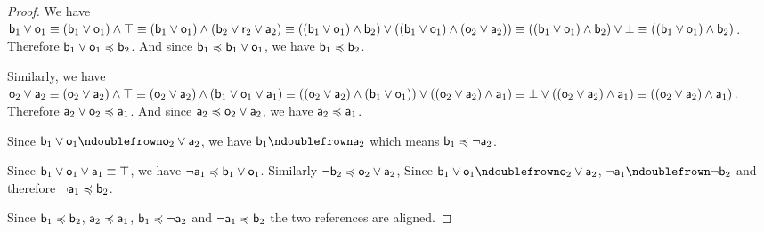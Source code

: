 \documentclass[11pt,letterpaper,fleqn]{memoir} %
\begin{document}
\begin{mathSection}
\begin{prop}
\end{prop}
\begin{proof}
	We have $\stmt[b]_1 \OR \stmt[o]_1 \equiv (\stmt[b]_1 \OR \stmt[o]_1) \AND \tautology \equiv (\stmt[b]_1 \OR \stmt[o]_1) \AND (\stmt[b]_2 \OR \stmt[r]_2 \OR \stmt[a]_2) \equiv ((\stmt[b]_1 \OR \stmt[o]_1) \AND \stmt[b]_2) \OR ((\stmt[b]_1 \OR \stmt[o]_1) \AND (\stmt[o]_2 \OR \stmt[a]_2)) \equiv ((\stmt[b]_1 \OR \stmt[o]_1) \AND \stmt[b]_2) \OR \contradiction \equiv ((\stmt[b]_1 \OR \stmt[o]_1) \AND \stmt[b]_2)$. Therefore $\stmt[b]_1 \OR \stmt[o]_1 \narrower \stmt[b]_2$. And since $\stmt[b]_1 \narrower \stmt[b]_1 \OR \stmt[o]_1$, we have $\stmt[b]_1 \narrower \stmt[b]_2$.
	
	Similarly, we have $\stmt[o]_2 \OR \stmt[a]_2 \equiv (\stmt[o]_2 \OR \stmt[a]_2) \AND \tautology \equiv (\stmt[o]_2 \OR \stmt[a]_2) \AND (\stmt[b]_1 \OR \stmt[o]_1 \OR \stmt[a]_1) \equiv ((\stmt[o]_2 \OR \stmt[a]_2) \AND (\stmt[b]_1 \OR \stmt[o]_1)) \OR ((\stmt[o]_2 \OR \stmt[a]_2) \AND \stmt[a]_1) \equiv \contradiction \OR ((\stmt[o]_2 \OR \stmt[a]_2) \AND \stmt[a]_1) \equiv ((\stmt[o]_2 \OR \stmt[a]_2) \AND \stmt[a]_1)$. Therefore $\stmt[a]_2 \OR \stmt[o]_2 \narrower \stmt[a]_1$. And since $\stmt[a]_2 \narrower \stmt[o]_2 \OR \stmt[a]_2$, we have $\stmt[a]_2 \narrower \stmt[a]_1$.
	
	Since $\stmt[b]_1 \OR \stmt[o]_1 \ncomp \stmt[o]_2 \OR \stmt[a]_2$, we have $\stmt[b]_1 \ncomp \stmt[a]_2$ which means $\stmt[b]_1 \narrower \NOT \stmt[a]_2$.
	
	Since $\stmt[b]_1 \OR \stmt[o]_1 \OR \stmt[a]_1 \equiv \tautology$, we have $\NOT \stmt[a]_1 \narrower \stmt[b]_1 \OR \stmt[o]_1$. Similarly $\NOT \stmt[b]_2 \narrower \stmt[o]_2 \OR \stmt[a]_2$, Since $\stmt[b]_1 \OR \stmt[o]_1 \ncomp \stmt[o]_2 \OR \stmt[a]_2$, $\NOT \stmt[a]_1 \ncomp \NOT \stmt[b]_2$ and therefore $\NOT \stmt[a]_1 \narrower \stmt[b]_2$.
	
	Since $\stmt[b]_1 \narrower \stmt[b]_2$, $\stmt[a]_2 \narrower \stmt[a]_1$, $\stmt[b]_1 \narrower \NOT \stmt[a]_2$ and $\NOT \stmt[a]_1 \narrower \stmt[b]_2$ the two references are aligned.
\end{proof}
\end{mathSection}
 
\end{document}
